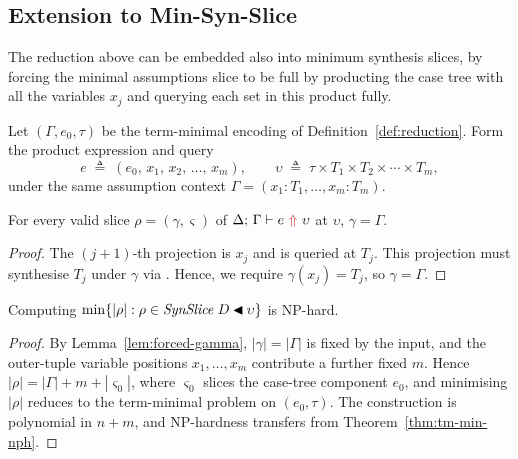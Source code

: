 \subsection{\no Extension to Min-Syn-Slice}\label{sec:min-syn-extension}

The reduction above can be embedded also into minimum synthesis slices, by forcing the minimal assumptions slice to be full by producting the case tree with all the variables $x_j$ and querying each set in this product fully.

\begin{definition}\label{def:syn-reduction}
Let $(\Gamma, e_0, \tau)$ be the term-minimal encoding of Definition~\ref{def:reduction}. Form the product expression and query
\[
  e \;\triangleq\; (e_0,\, x_1,\, x_2,\, \dots,\, x_m),
  \qquad
  \upsilon \;\triangleq\; \tau \times T_1 \times T_2 \times \cdots \times T_m,
\]
under the same assumption context $\Gamma = (x_1 : T_1, \dots, x_m : T_m)$.
\end{definition}

\begin{lemma}\label{lem:forced-gamma}
For every valid slice $\rho = (\gamma, \varsigma)$ of $\synthesis{e}{\upsilon}$ at $\upsilon$, $\gamma = \Gamma$.
\end{lemma}

\begin{proof}
The $(j+1)$-th projection is $x_j$ and is queried at $T_j$. This projection must synthesise $T_j$ under $\gamma$ via . Hence, we require $\gamma(x_j) = T_j$, so $\gamma = \Gamma$.
\end{proof}

\begin{majortheorembox}
\begin{theorem}\label{thm:syn-min-nph}
Computing $\min\{|\rho| : \rho \in \mathit{SynSlice}\;D \mathbin{\blacktriangleleft} \upsilon\}$ is NP-hard.
\end{theorem}
\end{majortheorembox}

\begin{proof}
By Lemma~\ref{lem:forced-gamma}, $|\gamma| = |\Gamma|$ is fixed by the input, and the outer-tuple variable positions $x_1, \dots, x_m$ contribute a further fixed $m$. Hence $|\rho| = |\Gamma| + m + |\varsigma_0|$, where $\varsigma_0$ slices the case-tree component $e_0$, and minimising $|\rho|$ reduces to the term-minimal problem on $(e_0, \tau)$. The construction is polynomial in $n + m$, and NP-hardness transfers from Theorem~\ref{thm:tm-min-nph}.
\end{proof}

